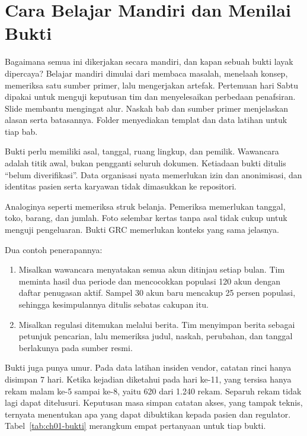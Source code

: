\section{Cara Belajar Mandiri dan Menilai Bukti}

Bagaimana semua ini dikerjakan secara mandiri, dan kapan sebuah bukti layak dipercaya?
Belajar mandiri dimulai dari membaca masalah, menelaah konsep, memeriksa satu sumber primer,
lalu mengerjakan artefak. Pertemuan hari Sabtu dipakai untuk menguji keputusan tim dan
menyelesaikan perbedaan penafsiran. Slide membantu mengingat alur. Naskah bab dan sumber
primer menjelaskan alasan serta batasannya. Folder  menyediakan templat dan
data latihan untuk tiap bab.

Bukti perlu memiliki asal, tanggal, ruang lingkup, dan pemilik. Wawancara adalah titik awal,
bukan pengganti seluruh dokumen. Ketiadaan bukti ditulis ``belum diverifikasi''. Data
organisasi nyata memerlukan izin dan anonimisasi, dan identitas pasien serta karyawan tidak
dimasukkan ke repositori.

Analoginya seperti memeriksa struk belanja. Pemeriksa memerlukan tanggal, toko, barang, dan
jumlah. Foto selembar kertas tanpa asal tidak cukup untuk menguji pengeluaran. Bukti GRC
memerlukan konteks yang sama jelasnya.

Dua contoh penerapannya:
\begin{enumerate}
  \item Misalkan wawancara menyatakan semua akun ditinjau setiap bulan. Tim meminta hasil
  dua periode dan mencocokkan populasi 120 akun dengan daftar penugasan aktif. Sampel 30
  akun baru mencakup 25 persen populasi, sehingga kesimpulannya ditulis sebatas cakupan itu.
  \item Misalkan regulasi ditemukan melalui berita. Tim menyimpan berita sebagai petunjuk
  pencarian, lalu memeriksa judul, naskah, perubahan, dan tanggal berlakunya pada sumber
  resmi.
\end{enumerate}

Bukti juga punya umur. Pada data latihan insiden vendor, catatan rinci hanya disimpan 7 hari.
Ketika kejadian diketahui pada hari ke-11, yang tersisa hanya rekam malam ke-5 sampai ke-8,
yaitu 620 dari 1.240 rekam. Separuh rekam tidak lagi dapat ditelusuri. Keputusan masa simpan
catatan akses, yang tampak teknis, ternyata menentukan apa yang dapat dibuktikan kepada
pasien dan regulator. Tabel~\ref{tab:ch01-bukti} merangkum empat pertanyaan untuk tiap bukti.

